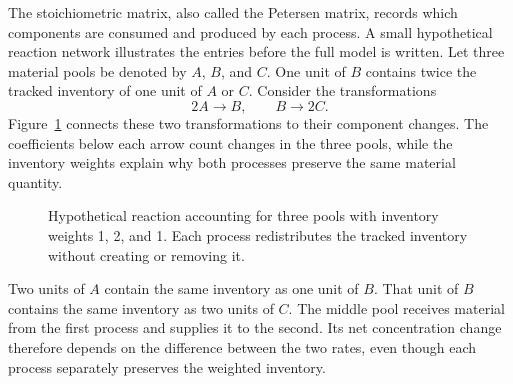 The stoichiometric matrix, also called the Petersen matrix, records which components are consumed and produced by each process. A small hypothetical reaction network illustrates the entries before the full model is written. Let three material pools be denoted by $A$, $B$, and $C$. One unit of $B$ contains twice the tracked inventory of one unit of $A$ or $C$. Consider the transformations
\[
2A\longrightarrow B,\qquad B\longrightarrow2C.
\]
Figure~\ref{fig:reactor_reaction_accounting} connects these two transformations to their component changes. The coefficients below each arrow count changes in the three pools, while the inventory weights explain why both processes preserve the same material quantity.

\begin{figure}[htbp]
\centering

\caption{Hypothetical reaction accounting for three pools with inventory weights 1, 2, and 1. Each process redistributes the tracked inventory without creating or removing it.}
\label{fig:reactor_reaction_accounting}
\end{figure}

Two units of $A$ contain the same inventory as one unit of $B$. That unit of $B$ contains the same inventory as two units of $C$. The middle pool receives material from the first process and supplies it to the second. Its net concentration change therefore depends on the difference between the two rates, even though each process separately preserves the weighted inventory.

